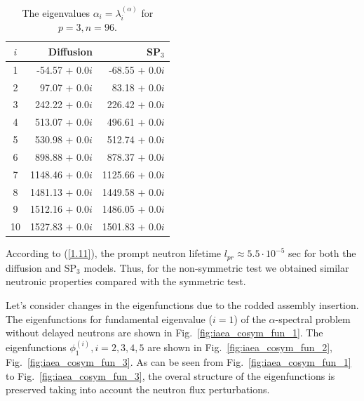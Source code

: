 \documentclass[authoryear]{elsarticle}
\begin{document}
\begin{table}[h]
\caption{The eigenvalues $\alpha_i=\lambda_i^{(\alpha)}$ for $p=3, n=96$.}
\label{tab:iaea_cosym_alpha_10}
\begin{center}
\begin{tabular}{crr}
\hline
$i$ & Diffusion & SP$_3$ \\
\hline
1 &-54.57 + 0.0$i$&-68.55 + 0.0$i$ \\
2 &  97.07 + 0.0$i$&83.18 + 0.0$i$ \\
3 &242.22 + 0.0$i$&226.42 + 0.0$i$ \\
4 &513.07 + 0.0$i$&496.61 + 0.0$i$ \\
5 &530.98 + 0.0$i$&512.74 + 0.0$i$ \\
6 &898.88 + 0.0$i$&878.37 + 0.0$i$ \\
7 &1148.46 + 0.0$i$&1125.66 + 0.0$i$ \\
8 &1481.13 + 0.0$i$&1449.58 + 0.0$i$ \\
9 &1512.16 + 0.0$i$&1486.05 + 0.0$i$ \\
10&1527.83 + 0.0$i$&1501.83 + 0.0$i$ \\
\hline
\end{tabular}
\end{center}
\end{table}

According to (\ref{1.11}), the prompt neutron lifetime $l_{pr} \approx 5.5 \cdot 10^{-5}$ sec for both the diffusion and $\mathrm{SP_3}$ models. Thus, for the non-symmetric test we obtained similar neutronic properties compared with the symmetric test. 

Let's consider changes in the eigenfunctions due to the rodded assembly insertion.
The eigenfunctions for fundamental eigenvalue ($i=1$) of the $\alpha$-spectral problem without delayed neutrons are shown in Fig.~\ref{fig:iaea_cosym_fun_1}. 
The eigenfunctions $\phi_1^{(i)}, i=2,3,4,5$ are shown in  Fig.~\ref{fig:iaea_cosym_fun_2}, Fig.~\ref{fig:iaea_cosym_fun_3}.
As can be seen from Fig.~\ref{fig:iaea_cosym_fun_1} to Fig.~\ref{fig:iaea_cosym_fun_3}, the overal structure of the eigenfunctions is preserved taking into account the neutron flux perturbations.
\end{document}
